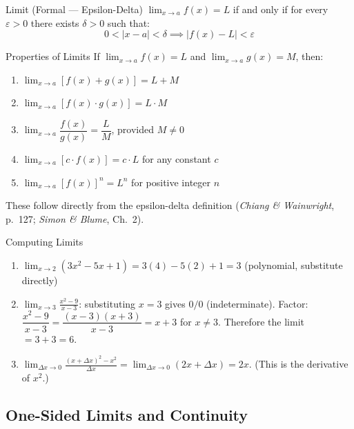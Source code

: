 \documentclass[12pt, a4paper]{article}
\theoremstyle{definition}
\newcommand{\abs}[1]{\left|#1\right|}
\newcommand{\limit}[2]{\lim_{#1 \to #2}}
\begin{document}
\begin{defbox}{Limit (Formal --- Epsilon-Delta)}
$\displaystyle\limit{x}{a} f(x) = L$ if and only if for every $\varepsilon > 0$
there exists $\delta > 0$ such that:
\[
  0 < \abs{x - a} < \delta \implies \abs{f(x) - L} < \varepsilon
\]
\end{defbox}

\begin{keybox}{Properties of Limits}
If $\displaystyle\limit{x}{a} f(x) = L$ and $\displaystyle\limit{x}{a} g(x) = M$, then:
\begin{enumerate}
  \item $\displaystyle\limit{x}{a}[f(x) + g(x)] = L + M$
  \item $\displaystyle\limit{x}{a}[f(x) \cdot g(x)] = L \cdot M$
  \item $\displaystyle\limit{x}{a}\dfrac{f(x)}{g(x)} = \dfrac{L}{M}$, provided $M \neq 0$
  \item $\displaystyle\limit{x}{a}[c \cdot f(x)] = c \cdot L$ for any constant $c$
  \item $\displaystyle\limit{x}{a}[f(x)]^n = L^n$ for positive integer $n$
\end{enumerate}
These follow directly from the epsilon-delta definition
(\textit{Chiang \& Wainwright}, p.\ 127; \textit{Simon \& Blume}, Ch.\ 2).
\end{keybox}

\begin{exbox}{Computing Limits}
\begin{enumerate}
  \item $\displaystyle\limit{x}{2}(3x^2 - 5x + 1) = 3(4) - 5(2) + 1 = 3$ \quad
    (polynomial, substitute directly)

  \item $\displaystyle\limit{x}{3}\frac{x^2-9}{x-3}$: substituting $x=3$ gives $0/0$ (indeterminate).
  Factor: $\dfrac{x^2-9}{x-3} = \dfrac{(x-3)(x+3)}{x-3} = x+3$ for $x\neq 3$.
  Therefore the limit $= 3+3 = 6$.

  \item $\displaystyle\limit{\Delta x}{0}\frac{(x+\Delta x)^2 - x^2}{\Delta x}
    = \limit{\Delta x}{0}(2x + \Delta x) = 2x$. \quad
    (This is the derivative of $x^2$.)
\end{enumerate}
\end{exbox}

\subsection{One-Sided Limits and Continuity}
\end{document}
